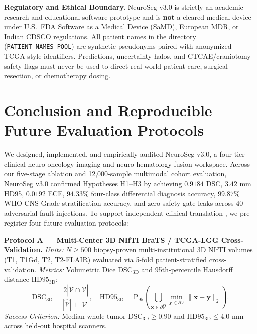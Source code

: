 \documentclass[conference]{IEEEtran}
\begin{document}
\textbf{Regulatory and Ethical Boundary.} NeuroSeg v3.0 is strictly an academic research and educational software prototype and is \textbf{not} a cleared medical device under U.S.\ FDA Software as a Medical Device (SaMD), European MDR, or Indian CDSCO regulations. All patient names in the directory (\texttt{PATIENT\_NAMES\_POOL}) are synthetic pseudonyms paired with anonymized TCGA-style identifiers. Predictions, uncertainty halos, and CTCAE/craniotomy safety flags must never be used to direct real-world patient care, surgical resection, or chemotherapy dosing.

\section{Conclusion and Reproducible Future Evaluation Protocols}
We designed, implemented, and empirically audited NeuroSeg v3.0, a four-tier clinical neuro-oncology imaging and neuro-hematology fusion workspace. Across our five-stage ablation and 12,000-sample multimodal cohort evaluation, NeuroSeg v3.0 confirmed Hypotheses H1--H3 by achieving $0.9184$ DSC, $3.42\text{ mm}$ HD95, $0.0192$ ECE, $94.33\%$ four-class differential diagnosis accuracy, $99.87\%$ WHO CNS Grade stratification accuracy, and zero safety-gate leaks across 40 adversarial fault injections. To support independent clinical translation \cite{peng2011reproducible, reinke2024metrics}, we pre-register four future evaluation protocols:

\textbf{Protocol A --- Multi-Center 3D NIfTI BraTS / TCGA-LGG Cross-Validation.} \textit{Units:} $N \ge 500$ biopsy-proven multi-institutional 3D NIfTI volumes (T1, T1Gd, T2, T2-FLAIR) evaluated via 5-fold patient-stratified cross-validation. \textit{Metrics:} Volumetric Dice $\text{DSC}_{\text{3D}}$ and 95th-percentile Hausdorff distance $\text{HD95}_{\text{3D}}$:
\begin{equation}
    \text{DSC}_{\text{3D}} = \frac{2|\hat{\mathcal{V}} \cap \mathcal{V}|}{|\hat{\mathcal{V}}| + |\mathcal{V}|}, \quad \text{HD95}_{\text{3D}} = \text{P}_{95}\!\left(\bigcup_{\mathbf{x}\in\partial\hat{\mathcal{V}}}\min_{\mathbf{y}\in\partial\mathcal{V}}\|\mathbf{x}-\mathbf{y}\|_2\right).
    \label{eq:prot_a}
\end{equation}
\textit{Success Criterion:} Median whole-tumor $\text{DSC}_{\text{3D}} \ge 0.90$ and $\text{HD95}_{\text{3D}} \le 4.0\text{ mm}$ across held-out hospital scanners.
\end{document}
